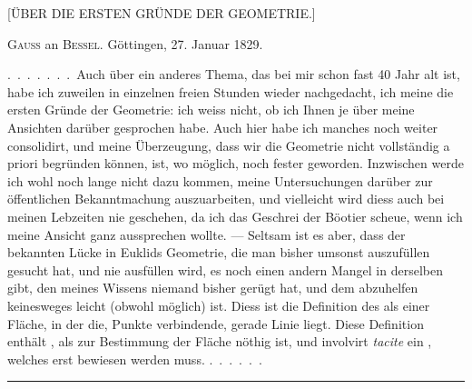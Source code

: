 \clearpage
\begin{center}
[ÜBER DIE ERSTEN GRÜNDE DER GEOMETRIE.]
\end{center}

\begin{center}
\textsc{Gauss} an \textsc{Bessel}. Göttingen, 27. Januar 1829.
\end{center}

.\ .\ .\ .\ .\ .\ .\ Auch über ein anderes Thema, das bei mir schon fast 40 Jahr
alt ist, habe ich zuweilen in einzelnen freien Stunden wieder nachgedacht, ich
meine die ersten Gründe der Geometrie: ich weiss nicht, ob ich Ihnen je über
meine Ansichten darüber gesprochen habe. Auch hier habe ich manches noch
weiter consolidirt, und meine Überzeugung, dass wir die Geometrie nicht vollständig a priori begründen können, ist, wo möglich, noch fester geworden.
Inzwischen werde ich wohl noch lange nicht dazu kommen, meine  Untersuchungen darüber zur öffentlichen Bekanntmachung auszuarbeiten, und vielleicht wird diess auch bei meinen Lebzeiten nie geschehen,
da ich das Geschrei der Böotier scheue, wenn ich meine Ansicht ganz aussprechen wollte. --- Seltsam ist es aber, dass  der bekannten Lücke in
Euklids Geometrie, die man bisher umsonst auszufüllen gesucht hat, und nie
ausfüllen wird, es noch einen andern Mangel in derselben gibt, den meines
Wissens niemand bisher gerügt hat, und dem abzuhelfen keinesweges leicht
(obwohl möglich) ist. Diess ist die Definition des  als einer Fläche,
in der die,  Punkte verbindende, gerade Linie  liegt. Diese
Definition enthält , als zur Bestimmung der Fläche nöthig ist, und involvirt \emph{tacite} ein , welches erst bewiesen werden muss. .\ .\ .\ .\ .\ .

\rule{4cm}{0.5pt}

